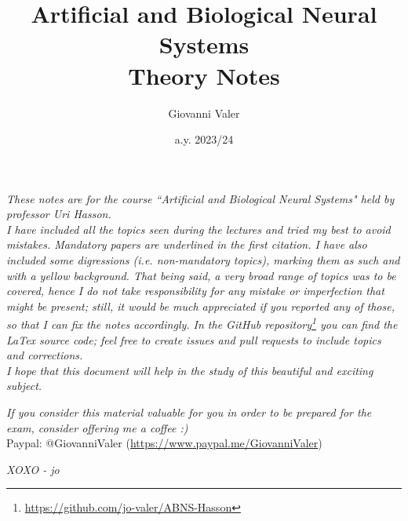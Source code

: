 \documentclass[]{report}
\title{\textbf{Artificial and Biological Neural Systems}\\\large \textbf{Theory Notes}}
\author{Giovanni Valer}
\date{a.y. 2023/24}
\begin{document}
\maketitle
{}

\newpage
{}
\textit{These notes are for the course ``Artificial and Biological Neural Systems" held by professor Uri Hasson.\\
I have included all the topics seen during the lectures and tried my best to avoid mistakes. Mandatory papers are underlined in the first citation. I have also included some digressions (i.e. non-mandatory topics), marking them as such and with a yellow background. That being said, a very broad range of topics was to be covered, hence I do not take responsibility for any mistake or imperfection that might be present; still, it would be much appreciated if you reported any of those, so that I can fix the notes accordingly.
In the GitHub repository\footnote{\url{https://github.com/jo-valer/ABNS-Hasson}} you can find the LaTex source code; feel free to create issues and pull requests to include topics and corrections.\\
I hope that this document will help in the study of this beautiful and exciting subject.}
\newline

\textit{If you consider this material valuable for you in order to be prepared for the exam, consider offering me a coffee :)}\\
Paypal: @GiovanniValer (\url{https://www.paypal.me/GiovanniValer})
\newline

\textit{XOXO - jo}
\restoregeometry
\newpage

\tableofcontents
\clearpage







% 
% 
% 

% 


\end{document}
